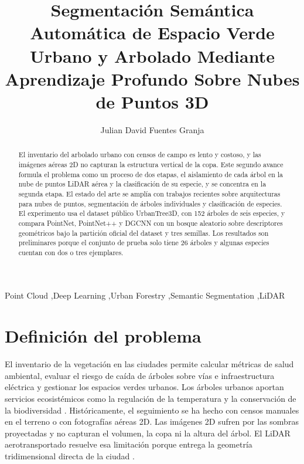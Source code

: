 \documentclass[preprint,12pt]{elsarticle}
\begin{document}
\begin{frontmatter}

\title{Segmentación Semántica Automática de Espacio Verde Urbano y Arbolado Mediante Aprendizaje Profundo Sobre Nubes de Puntos 3D}

\author{Julian David Fuentes Granja}

\begin{abstract}
El inventario del arbolado urbano con censos de campo es lento y costoso, y las imágenes aéreas 2D no capturan la estructura vertical de la copa. Este segundo avance formula el problema como un proceso de dos etapas, el aislamiento de cada árbol en la nube de puntos LiDAR aérea y la clasificación de su especie, y se concentra en la segunda etapa. El estado del arte se amplía con trabajos recientes sobre arquitecturas para nubes de puntos, segmentación de árboles individuales y clasificación de especies. El experimento usa el dataset público UrbanTree3D, con 152 árboles de seis especies, y compara PointNet, PointNet++ y DGCNN con un bosque aleatorio sobre descriptores geométricos bajo la partición oficial del dataset y tres semillas. Los resultados son preliminares porque el conjunto de prueba solo tiene 26 árboles y algunas especies cuentan con dos o tres ejemplares.
\end{abstract}

\begin{keyword}
Point Cloud \sep Deep Learning \sep Urban Forestry \sep Semantic Segmentation \sep LiDAR
\end{keyword}

\end{frontmatter}

\section{Definición del problema}
\label{sec:problema}

El inventario de la vegetación en las ciudades permite calcular métricas de salud ambiental, evaluar el riesgo de caída de árboles sobre vías e infraestructura eléctrica y gestionar los espacios verdes urbanos. Los árboles urbanos aportan servicios ecosistémicos como la regulación de la temperatura y la conservación de la biodiversidad \cite{fath2025urbantrees,jovanovic2025urbantrees}. Históricamente, el seguimiento se ha hecho con censos manuales en el terreno o con fotografías aéreas 2D. Las imágenes 2D sufren por las sombras proyectadas y no capturan el volumen, la copa ni la altura del árbol. El LiDAR aerotransportado resuelve esa limitación porque entrega la geometría tridimensional directa de la ciudad \cite{oshio2024mapping,dong2025highprecision}.
\end{document}
